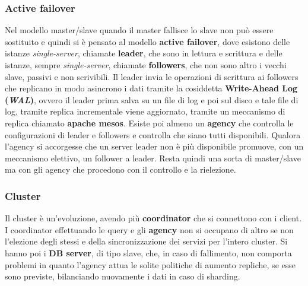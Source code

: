 \documentclass[a4paper,12pt, oneside]{book}
\begin{document}
\subsubsection{Active failover}
Nel modello master/slave quando il master fallisce lo slave non può essere
sostituito e quindi si è pensato al modello \textbf{active failover}, dove
esistono delle istanze \textit{single-server}, chiamate \textbf{leader}, che
sono in lettura e scrittura e delle istanze, sempre \textit{single-server},
chiamate \textbf{followers}, che non sono altro i vecchi slave, passivi e non
scrivibili. Il leader invia le operazioni di scrittura ai followers che
replicano in modo asincrono i dati tramite la cosiddetta \textbf{Write-Ahead Log
  (\textit{WAL})}, ovvero il leader prima salva su un file di log e poi sul
disco e tale file di log, tramite replica incrementale viene aggiornato, tramite
un meccanismo di replica chiamato \textbf{apache mesos}. Esiste poi almeno un
\textbf{agency} che controlla le configurazioni di leader e followers e
controlla che siano tutti disponibili. Qualora l'agency si accorgesse che un
server leader non è più disponibile promuove, con un meccanismo elettivo, un
follower a leader. Resta quindi una sorta di master/slave ma con gli agency che
procedono con il controllo e la rielezione.
\subsubsection{Cluster}
Il cluster è un'evoluzione, avendo più \textbf{coordinator} che si connettono
con i client. I coordinator effettuando le query e gli \textbf{agency} non si
occupano di altro se non l'elezione degli stessi e della sincronizzazione dei
servizi per l'intero cluster. Si hanno poi i \textbf{DB server}, di tipo slave,
che, in caso di fallimento, non comporta problemi in quanto l'agency attua le
solite politiche di aumento repliche, se esse sono previste, bilanciando
nuovamente i dati in caso di sharding.\\
\end{document}

